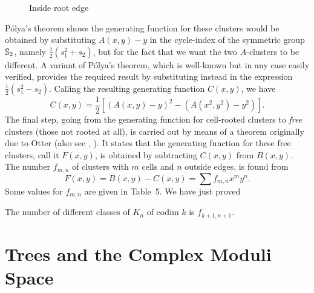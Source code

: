 \documentclass[10pt]{amsart}
\begin{document}
    \begin{figure}[h]
    \caption{Inside root edge}
    \label{irootedge}
    \end{figure}
    
    P\'{o}lya's theorem shows the generating function for these clusters would be obtained by substituting $A(x, y) - y$ in the cycle-index of the symmetric group $\mathbb S_2$, namely $\frac{1}{2}(s_1^2  +  s_2)$, but for the fact that we want the two $A$-clusters to be different.  A variant of P\'{o}lya's theorem, which is well-known but in any case easily verified, provides the required result by substituting instead in the expression $\frac{1}{2}(s_1^2  -  s_2)$. Calling the resulting generating function
    $C(x, y)$, we have 
    $$C(x, y) =\frac{1}{2}[(A(x, y)-y)^2 - (A(x^2, y^2)-y^2)].$$
    The final step, going from the generating function for cell-rooted clusters to {\em free} clusters (those not rooted at all), is carried out by means of a theorem originally due to Otter \cite{ott} (also see \cite{hp}, \cite[\S4]{r1}). It states that the generating function for these free clusters, call it $F(x, y)$, is obtained by subtracting $C(x, y)$ from $B(x, y)$.  The number $f_{m,n}$ of clusters with $m$ cells and $n$ outside edges, is found from
    $$F(x, y) = B(x,y) - C(x,y) = \sum f_{m,n}x^m y^n.$$
    Some values for $f_{m,n}$ are given in Table~5.  We have just proved
    
    \begin{thm} [Solution to {\em P1}\,]
    The number of different classes of $K_n$ of codim $k$ is $f_{k+1,n+1}$. 
    \end{thm}
    
                        
    \section {Trees and the Complex Moduli Space}
    
\end{document}
